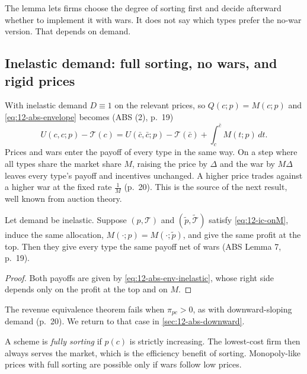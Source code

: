 The lemma lets firms choose the degree of sorting first and decide afterward whether to implement it with
wars. It does not say which types prefer the no-war version. That depends on demand.

\subsection{Inelastic demand: full sorting, no wars, and rigid prices}\label{sec:12-abs-inelastic}

With inelastic demand $D \equiv 1$ on the relevant prices, so $Q(c; p) = M(c; p)$ and \eqref{eq:12-abs-envelope}
becomes (ABS (2), p.~19)
\begin{equation}\label{eq:12-abs-env-inelastic}
U(c, c; p) - \mathcal T(c) = U(\bar c, \bar c; p) - \mathcal T(\bar c) + \int_c^{\bar c}M(t; p)\,dt .
\end{equation}
Prices and wars enter the payoff of every type in the same way. On a step where all types share the market share
$M$, raising the price by $\Delta$ and the war by $M\Delta$ leaves every type's payoff and incentives unchanged. A
higher price trades against a higher war at the fixed rate $\frac{1}{M}$ (p.~20). This is the source of the next
result, well known from auction theory.

\begin{lemma}\label{lem:12-abs-revenue}
Let demand be inelastic. Suppose $(p, \mathcal T)$ and $(\tilde p, \tilde{\mathcal T})$ satisfy
\eqref{eq:12-ic-onM}, induce the same allocation, $M(\cdot; p) = M(\cdot; \tilde p)$, and give the same profit at the
top. Then they give every type the same payoff net of wars (ABS Lemma 7, p.~19).
\end{lemma}

\begin{proof}
Both payoffs are given by \eqref{eq:12-abs-env-inelastic}, whose right side depends only on the profit at the top and
on $M$.
\end{proof}

The revenue equivalence theorem fails when $\pi_{pc} > 0$, as with downward-sloping demand (p.~20). We return to that
case in \cref{sec:12-abs-downward}.

A scheme is \emph{fully sorting} if $p(c)$ is strictly increasing. The lowest-cost firm then always serves the market,
which is the efficiency benefit of sorting. Monopoly-like prices with full sorting are possible only if wars follow
low prices.

